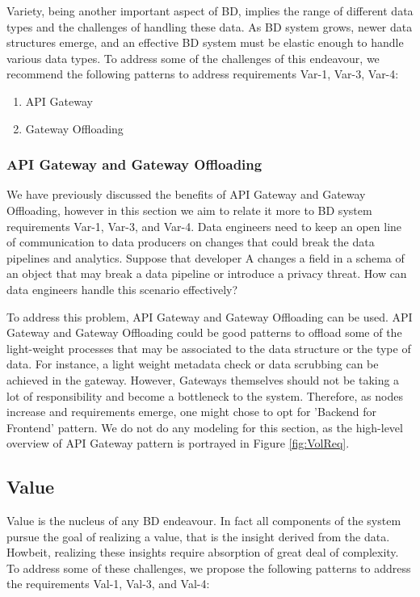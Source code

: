 \documentclass{bmcart}
\begin{document}
Variety, being another important aspect of BD, implies the range of different data types and the challenges of handling these data. As BD system grows, newer data structures emerge, and an effective BD system must be elastic enough to handle various data types. To address some of the challenges of this endeavour, we recommend the following patterns to address requirements Var-1, Var-3, Var-4:

\begin{enumerate}
  \item API Gateway
  \item Gateway Offloading
\end{enumerate}


\subsubsection{API Gateway and Gateway Offloading}

We have previously discussed the benefits of API Gateway and Gateway Offloading, however in this section we aim to relate it more to BD system requirements Var-1, Var-3, and Var-4. Data engineers need to keep an open line of communication to data producers on changes that could break the data pipelines and analytics. Suppose that developer A changes a field in a schema of an object that may break a data pipeline or introduce a privacy threat. How can data engineers handle this scenario effectively? 

To address this problem, API Gateway and Gateway Offloading can be used. API Gateway and Gateway Offloading could be good patterns to offload some of the light-weight processes that may be associated to the data structure or the type of data. For instance, a light weight metadata check or data scrubbing can be achieved in the gateway. However, Gateways themselves should not be taking a lot of responsibility and become a bottleneck to the system. Therefore, as nodes increase and requirements emerge, one might chose to opt for 'Backend for Frontend' pattern. We do not do any modeling for this section, as the high-level overview of API Gateway pattern is portrayed in Figure \ref{fig:VolReq}.

\subsection{Value}

Value is the nucleus of any BD endeavour. In fact all components of the system pursue the goal of realizing a value, that is the insight derived from the data. Howbeit, realizing these insights require absorption of great deal of complexity. To address some of these challenges, we propose the following patterns to address the requirements Val-1, Val-3, and Val-4:
\end{document}
